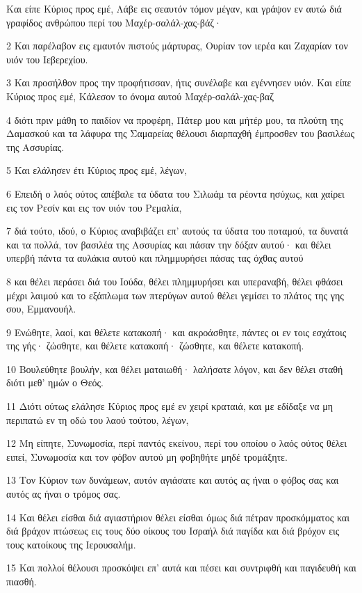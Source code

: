 \par Και είπε Κύριος προς εμέ, Λάβε εις σεαυτόν τόμον μέγαν, και γράψον εν αυτώ διά γραφίδος ανθρώπου περί του Μαχέρ-σαλάλ-χας-βάζ·
\par 2 Και παρέλαβον εις εμαυτόν πιστούς μάρτυρας, Ουρίαν τον ιερέα και Ζαχαρίαν τον υιόν του Ιεβερεχίου.
\par 3 Και προσήλθον προς την προφήτισσαν, ήτις συνέλαβε και εγέννησεν υιόν. Και είπε Κύριος προς εμέ, Κάλεσον το όνομα αυτού Μαχέρ-σαλάλ-χας-βαζ
\par 4 διότι πριν μάθη το παιδίον να προφέρη, Πάτερ μου και μήτέρ μου, τα πλούτη της Δαμασκού και τα λάφυρα της Σαμαρείας θέλουσι διαρπαχθή έμπροσθεν του βασιλέως της Ασσυρίας.
\par 5 Και ελάλησεν έτι Κύριος προς εμέ, λέγων,
\par 6 Επειδή ο λαός ούτος απέβαλε τα ύδατα του Σιλωάμ τα ρέοντα ησύχως, και χαίρει εις τον Ρεσίν και εις τον υιόν του Ρεμαλία,
\par 7 διά τούτο, ιδού, ο Κύριος αναβιβάζει επ' αυτούς τα ύδατα του ποταμού, τα δυνατά και τα πολλά, τον βασιλέα της Ασσυρίας και πάσαν την δόξαν αυτού· και θέλει υπερβή πάντα τα αυλάκια αυτού και πλημμυρήσει πάσας τας όχθας αυτού
\par 8 και θέλει περάσει διά του Ιούδα, θέλει πλημμυρήσει και υπεραναβή, θέλει φθάσει μέχρι λαιμού και το εξάπλωμα των πτερύγων αυτού θέλει γεμίσει το πλάτος της γης σου, Εμμανουήλ.
\par 9 Ενώθητε, λαοί, και θέλετε κατακοπή· και ακροάσθητε, πάντες οι εν τοις εσχάτοις της γής· ζώσθητε, και θέλετε κατακοπή· ζώσθητε, και θέλετε κατακοπή.
\par 10 Βουλεύθητε βουλήν, και θέλει ματαιωθή· λαλήσατε λόγον, και δεν θέλει σταθή διότι μεθ' ημών ο Θεός.
\par 11 Διότι ούτως ελάλησε Κύριος προς εμέ εν χειρί κραταιά, και με εδίδαξε να μη περιπατώ εν τη οδώ του λαού τούτου, λέγων,
\par 12 Μη είπητε, Συνωμοσία, περί παντός εκείνου, περί του οποίου ο λαός ούτος θέλει ειπεί, Συνωμοσία και τον φόβον αυτού μη φοβηθήτε μηδέ τρομάξητε.
\par 13 Τον Κύριον των δυνάμεων, αυτόν αγιάσατε και αυτός ας ήναι ο φόβος σας και αυτός ας ήναι ο τρόμος σας.
\par 14 Και θέλει είσθαι διά αγιαστήριον θέλει είσθαι όμως διά πέτραν προσκόμματος και διά βράχον πτώσεως εις τους δύο οίκους του Ισραήλ διά παγίδα και διά βρόχον εις τους κατοίκους της Ιερουσαλήμ.
\par 15 Και πολλοί θέλουσι προσκόψει επ' αυτά και πέσει και συντριφθή και παγιδευθή και πιασθή.
